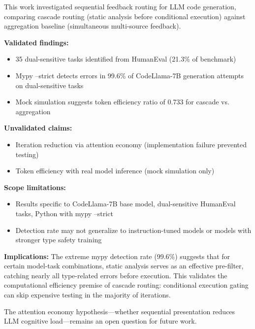 
This work investigated sequential feedback routing for LLM code generation, comparing cascade routing (static analysis before conditional execution) against aggregation baseline (simultaneous multi-source feedback).

\textbf{Validated findings:}
\begin{itemize}
\item 35 dual-sensitive tasks identified from HumanEval (21.3\% of benchmark)
\item Mypy --strict detects errors in 99.6\% of CodeLlama-7B generation attempts on dual-sensitive tasks
\item Mock simulation suggests token efficiency ratio of 0.733 for cascade vs. aggregation
\end{itemize}

\textbf{Unvalidated claims:}
\begin{itemize}
\item Iteration reduction via attention economy (implementation failure prevented testing)
\item Token efficiency with real model inference (mock simulation only)
\end{itemize}

\textbf{Scope limitations:}
\begin{itemize}
\item Results specific to CodeLlama-7B base model, dual-sensitive HumanEval tasks, Python with mypy --strict
\item Detection rate may not generalize to instruction-tuned models or models with stronger type safety training
\end{itemize}

\textbf{Implications:}
The extreme mypy detection rate (99.6\%) suggests that for certain model-task combinations, static analysis serves as an effective pre-filter, catching nearly all type-related errors before execution. This validates the computational efficiency premise of cascade routing: conditional execution gating can skip expensive testing in the majority of iterations.

The attention economy hypothesis---whether sequential presentation reduces LLM cognitive load---remains an open question for future work.
